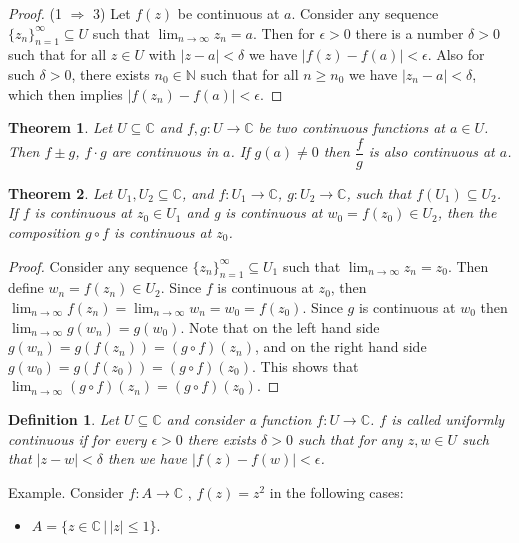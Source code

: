 \documentclass{amsart}
\newtheorem{thm}{Theorem}
\newtheorem{mydef}{Definition}
\begin{document}
\begin{proof}
(1 \(\Rightarrow\) 3) Let \(f(z)\) be continuous at \(a\). Consider any sequence \(\{z_n\}_{n=1}^{\infty}\subseteq U\) such that \(\lim_{n\to \infty} z_n = a\). Then for \(\epsilon >0\) there is a number \(\delta >0\) such that for all \(z\in U\) with \(|z-a|<\delta\) we have \(|f(z) - f(a)| < \epsilon\). Also for such \(\delta >0\), there exists \(n_0\in \mathbb{N}\) such that for all \(n\geq n_0\) we have \(|z_n - a| < \delta\), which then implies \(|f(z_n) - f(a)| < \epsilon\).
\end{proof}


\begin{thm}
Let \(U\subseteq\mathbb{C}\) and \(f,g:U\to \mathbb{C}\) be two continuous functions  at \(a\in U\). Then \(f\pm g\), \(f\cdot g\) are continuous in \(a\). If \(g(a) \neq 0\) then \(\dfrac{f}{g}\) is also continuous at \(a\).
\end{thm}


\begin{thm}
Let \(U_1, U_2 \subseteq \mathbb{C}\), and \(f:U_1\to \mathbb{C}\), \(g:U_2\to \mathbb{C}\), such that \(f(U_1)\subseteq U_2\). If \(f\) is continuous at \(z_0\in U_1\) and g is continuous at \(w_0 = f(z_0)\in U_2\), then the composition \(g\circ f\) is continuous at \(z_0\).
\end{thm}
\begin{proof}
Consider any sequence \(\{z_n\}_{n=1}^{\infty}\subseteq U_1\) such that \(\lim_{n\to \infty}z_n = z_0\). Then define \(w_n = f(z_n) \in U_2\). Since \(f\) is continuous at \(z_0\), then \(\lim_{n\to\infty}f(z_n) = \lim_{n\to\infty}w_n = w_0 = f(z_0)\). Since \(g\) is continuous at \(w_0\) then \(\lim_{n\to \infty}g(w_n) = g(w_0)\). Note that on the left hand side \(g(w_n) = g(f(z_n)) = (g\circ f)(z_n)\), and on the right hand side \(g(w_0) = g(f(z_0)) = (g\circ f)(z_0)\). This shows that \(\lim_{n\to\infty}(g\circ f)(z_n) = (g\circ f)(z_0)\).
\end{proof}


\begin{mydef}
Let \(U\subseteq \mathbb{C}\) and consider a function \(f:U\to\mathbb{C}\). \(f\) is called uniformly continuous if for every \(\epsilon >0\) there exists \(\delta >0\) such that for any \(z,w\in U\) such that \(|z-w| < \delta\) then we have \(|f(z) - f(w) | < \epsilon\).
\end{mydef}

\alert{Example}. Consider \(f: A\to \mathbb{C}\) , \(f(z) = z^2\) in the following cases:
\begin{itemize}
\item \(A = \{z\in \mathbb{C} \, |\, |z| \leq 1\}\).
\end{itemize}
\end{document}

